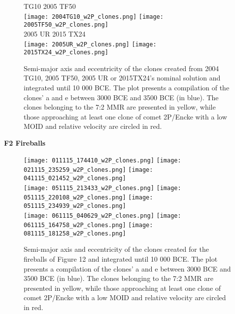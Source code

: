 \documentclass[a4paper,11pt]{article}
\begin{document}
\begin{figure*}[!ht]
   TG10 \hspace{7cm} 2005 TF50\\ 
  \texttt{[image: 2004TG10\_w2P\_clones.png]}
  \texttt{[image: 2005TF50\_w2P\_clones.png]}\\
  2005 UR \hspace{7cm} 2015 TX24\\
  \texttt{[image: 2005UR\_w2P\_clones.png]}
  \texttt{[image: 2015TX24\_w2P\_clones.png]}\\
  \caption{Semi-major axis and eccentricity of the clones created from 2004 TG10, 2005 TF50, 2005 UR or 2015TX24's nominal solution and integrated until 10 000 BCE. The plot presents a compilation of the clones' a and e between 3000 BCE and 3500 BCE (in blue). The clones belonging to the 7:2 MMR are presented in yellow, while those approaching at least one clone of comet 2P/Encke with a low MOID and relative velocity are circled in red. \label{fig:clones_selected}}
\end{figure*}

\newpage
\textbf{F2  Fireballs}\\

\begin{figure*}[!ht]
  \centering
  \texttt{[image: 011115\_174410\_w2P\_clones.png]}
  \texttt{[image: 021115\_235259\_w2P\_clones.png]}
  \texttt{[image: 041115\_021452\_w2P\_clones.png]}\\
  \texttt{[image: 051115\_213433\_w2P\_clones.png]}
  \texttt{[image: 051115\_220108\_w2P\_clones.png]}
  \texttt{[image: 051115\_234939\_w2P\_clones.png]}\\
  \texttt{[image: 061115\_040629\_w2P\_clones.png]}
  \texttt{[image: 061115\_164758\_w2P\_clones.png]}
  \texttt{[image: 081115\_181258\_w2P\_clones.png]}
  \caption{Semi-major axis and eccentricity of the clones created for the fireballs of Figure 12 and integrated until 10 000 BCE. The plot presents a compilation of the clones' a and e between 3000 BCE and 3500 BCE (in blue). The clones belonging to the 7:2 MMR are presented in yellow, while those approaching at least one clone of comet 2P/Encke with a low MOID and relative velocity are circled in red.}
  \label{fig:clones_selected_fireballs1}
\end{figure*}
\end{document}
